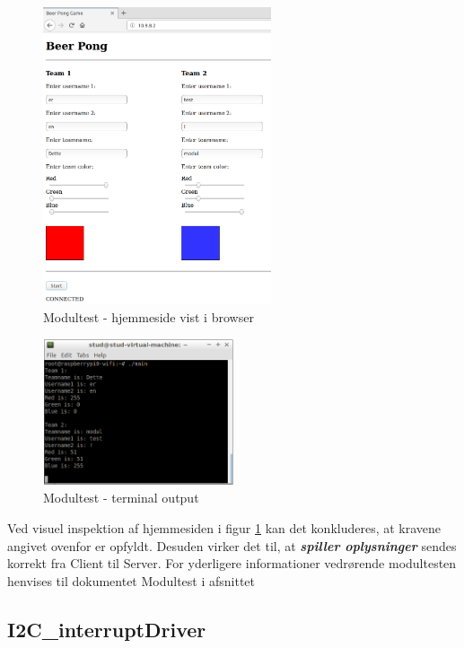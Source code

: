 \documentclass[Rapport/Rapport_main.tex]{subfiles}
\begin{document}
\begin{figure}[H]
    \centering
    \includegraphics[width=0.6\textwidth]{Modultest/WebPage/graphics/modultest_1.png}
    \caption{Modultest - hjemmeside vist i browser}
    \label{fig:webpage_modultest_rapport_1}
\end{figure}
\begin{figure}[H]
    \centering
    \includegraphics[width=0.5\textwidth]{Modultest/WebPage/graphics/modultest_2.png}
    \caption{Modultest - terminal output}
    \label{fig:webpage_modultest_rapport_2}
\end{figure}
Ved visuel inspektion af hjemmesiden i figur \ref{fig:webpage_modultest_rapport_1} kan det konkluderes, at kravene angivet ovenfor er opfyldt. Desuden virker det til, at \textit{\textbf{spiller oplysninger}} sendes korrekt fra Client til Server. For yderligere informationer vedrørende modultesten henvises til dokumentet Modultest i afsnittet 

\subsection{I2C\_interruptDriver}



\end{document}
